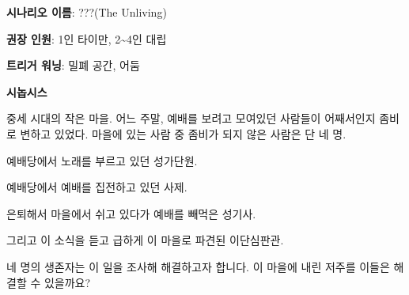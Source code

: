 \documentclass{report}
\begin{document}
	\textbf{시나리오 이름}: ???(The Unliving)
	
	\textbf{권장 인원}: 1인 타이만, 2\textasciitilde4인 대립
	
	\textbf{트리거 워닝}: 밀폐 공간, 어둠
	
	\textbf{시놉시스}
	
	중세 시대의 작은 마을. 어느 주말, 예배를 보려고 모여있던 사람들이 어째서인지 좀비로 변하고 있었다. 마을에 있는 사람 중 좀비가 되지 않은 사람은 단 네 명.
	
	예배당에서 노래를 부르고 있던 성가단원.
	
	예배당에서 예배를 집전하고 있던 사제.
	
	은퇴해서 마을에서 쉬고 있다가 예배를 빼먹은 성기사.
	
	그리고 이 소식을 듣고 급하게 이 마을로 파견된 이단심판관.
	
	네 명의 생존자는 이 일을 조사해 해결하고자 합니다. 이 마을에 내린 저주를 이들은 해결할 수 있을까요?
\end{document}
